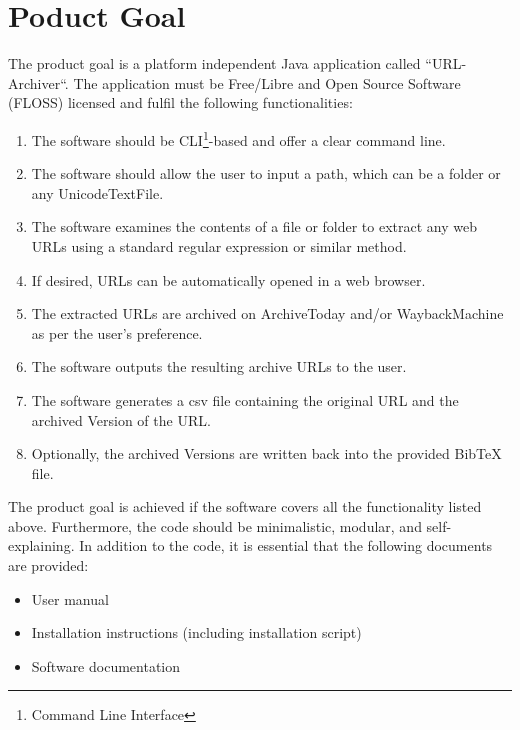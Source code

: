 \section{Poduct Goal}
The product goal  is a platform independent Java application called ``\gls{URL-Archiver}``.
The application must be Free/Libre and Open Source Software (\gls{FLOSS}) licensed and fulfil the following functionalities:
\begin{enumerate}
    \item The software should be \gls{CLI}\footnote{Command Line Interface}-based and offer a clear command line.
    \item The software should allow the user to input a path, which can be a folder or any \gls{UnicodeTextFile}.
    \item The software examines the contents of a file or folder to extract any web \glspl{URL} using a standard regular expression or similar method.
    \item If desired, URLs can be automatically opened in a web browser.
    \item The extracted URLs are archived on \gls{ArchiveToday} and/or \gls{WaybackMachine} as per the user's preference.
    \item The software outputs the resulting archive URLs to the user.
    \item The software generates a \gls{csv} file containing the original URL and the archived Version of the URL.
    \item Optionally, the archived Versions are written back into the provided \gls{BibTeX} file.
\end{enumerate}
The product goal is achieved if the software covers all the functionality listed above.
Furthermore, the code should be minimalistic, modular, and self-explaining.
In addition to the code, it is essential that the following documents are provided:
\begin{itemize}
    \item User manual
    \item Installation instructions (including installation script)
    \item Software documentation
\end{itemize}
\clearpage

